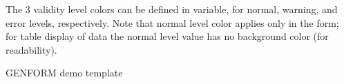 The 3 validity level colors can be defined in  variable, for normal, warning, and error levels, respectively. Note that normal level color applies only in the form; for table display of data the normal level value has no background color (for readability).




\begin{table}[htp]
\caption{GENFORM demo template}
\label{genform_template}

\end{table}


